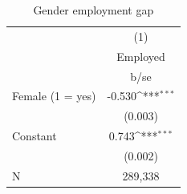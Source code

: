 \begin{table}[htbp]\centering
\def\sym#1{\ifmmode^{#1}\else\(^{#1}\)\fi}
\caption{Gender employment gap}
\begin{tabular}{l*{1}{c}}
\hline
                    &\multicolumn{1}{c}{(1)}\\
                    &\multicolumn{1}{c}{Employed}\\
                    &        b/se         \\
\hline
Female (1 = yes)    &      -0.530\sym{***}\\
                    &     (0.003)         \\
Constant            &       0.743\sym{***}\\
                    &     (0.002)         \\
\hline
N                   &     289,338         \\
\hline
\end{tabular}
\end{table}
